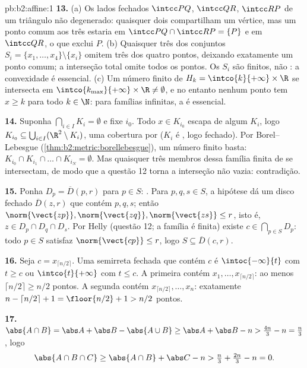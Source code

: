 \begin{solution}{pb:b2:affine:1}
\textbf{13.} (a) Os lados fechados $\intcc PQ$, $\intcc QR$,
$\intcc RP$ de um triângulo não degenerado: quaisquer dois compartilham um
vértice, mas um ponto comum aos três estaria em $\intcc
PQ \cap \intcc RP = \{P\}$ e em $\intcc QR$, o que exclui
$P$. (b) Quaisquer três dos conjuntos $S_i = \{x_1, \dots, x_4\}
\setminus \{x_i\}$ omitem três dos quatro pontos, deixando
exatamente um ponto comum; a interseção total omite todos os
pontos. Os $S_i$ são finitos, não : a convexidade é
essencial. (c) Um número finito de $H_k = \intco{k}{+\infty} \times
\R$ se intersecta em $\intco{k_{\max}}{+\infty} \times \R \neq
\emptyset$, e no entanto nenhum ponto tem $x \geq k$ para todo $k \in \N$:
para famílias infinitas, a  é essencial.

\textbf{14.} Suponha $\bigcap_{i \in I}K_i = \emptyset$ e
fixe $i_0$. Todo $x \in K_{i_0}$ escapa de algum $K_i$, logo
$K_{i_0} \subseteq \bigcup_{i \in I}(\R^2 \setminus K_i)$, uma
cobertura por  ($K_i$ é , logo fechado). Por
Borel--Lebesgue (\cref{thm:b2:metric:borellebesgue}), um número finito
basta: $K_{i_0} \cap K_{i_1} \cap \dots \cap K_{i_N} =
\emptyset$. Mas quaisquer três membros dessa família finita de
 se intersectam, de modo que a questão 12 torna a interseção
não vazia: contradição.

\textbf{15.} Ponha $D_p = \overline D(p, r)$ para $p \in S$:
 . Para $p, q, s \in S$, a hipótese
dá um disco fechado $\overline D(z, r)$ que contém $p, q, s$;
então $\norm{\vect{zp}}, \norm{\vect{zq}}, \norm{\vect{zs}}
\leq r$, isto é, $z \in D_p \cap D_q \cap D_s$. Por Helly
(questão 12; a família é finita) existe $c \in
\bigcap_{p \in S}D_p$: todo $p \in S$ satisfaz
$\norm{\vect{cp}} \leq r$, logo $S \subseteq \overline D(c,
r)$.

\textbf{16.} Seja $c = x_{\lceil n/2\rceil}$. Uma semirreta
fechada que contém $c$ é $\intoc{-\infty}{t}$ com $t \geq
c$ ou $\intco{t}{+\infty}$ com $t \leq c$. A primeira
contém $x_1, \dots, x_{\lceil n/2\rceil}$: ao menos
$\lceil n/2\rceil \geq n/2$ pontos. A segunda contém
$x_{\lceil n/2\rceil}, \dots, x_n$: exatamente $n - \lceil
n/2\rceil + 1 = \floor{n/2} + 1 > n/2$ pontos.

\textbf{17.} $\abs{A \cap B} = \abs A + \abs B - \abs{A \cup
B} \geq \abs A + \abs B - n > \tfrac{4n}3 - n = \tfrac n3$,
logo
\[
\abs{A \cap B \cap C} \geq \abs{A \cap B} + \abs C - n >
\tfrac n3 + \tfrac{2n}3 - n = 0 .
\]


\end{solution}
